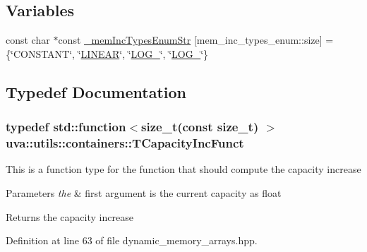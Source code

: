 \subsection*{Variables}
\begin{DoxyCompactItemize}
\item 
const char $\ast$const \hyperlink{namespaceuva_1_1utils_1_1containers_af8fa681c6894f17bfa25c736eb3d8ce8}{\+\_\+mem\+Inc\+Types\+Enum\+Str} \mbox{[}mem\+\_\+inc\+\_\+types\+\_\+enum\+::size\mbox{]} = \{\char`\"{}C\+O\+N\+S\+T\+A\+N\+T\char`\"{}, \char`\"{}\hyperlink{namespaceuva_1_1utils_1_1containers_a2dfd5027e0c656e7b8433760967da62daef7537589dc0f411a7215b5904b21073}{L\+I\+N\+E\+A\+R}\char`\"{}, \char`\"{}\hyperlink{namespaceuva_1_1utils_1_1containers_a2dfd5027e0c656e7b8433760967da62da8ca02671080014d040d3d1c7db41b447}{L\+O\+G\+\_}\char`\"{}, \char`\"{}\hyperlink{namespaceuva_1_1utils_1_1containers_a2dfd5027e0c656e7b8433760967da62daa0517306d9991f24d02b23c2df9ac368}{L\+O\+G\+\_}\char`\"{}\}
\end{DoxyCompactItemize}


\subsection{Typedef Documentation}
\hypertarget{namespaceuva_1_1utils_1_1containers_ab6acd1b6093503e17f6d8b942e9fccf1}{}
\subsubsection[{T\+Capacity\+Inc\+Funct}]{\setlength{\rightskip}{0pt plus 5cm}typedef std\+::function$<$size\+\_\+t(const size\+\_\+t) $>$ {\bf uva\+::utils\+::containers\+::\+T\+Capacity\+Inc\+Funct}}\label{namespaceuva_1_1utils_1_1containers_ab6acd1b6093503e17f6d8b942e9fccf1}
This is a function type for the function that should compute the capacity increase 
\begin{DoxyParams}{Parameters}
{\em the} & first argument is the current capacity as float \\
\hline
\end{DoxyParams}
\begin{DoxyReturn}{Returns}
the capacity increase 
\end{DoxyReturn}


Definition at line 63 of file dynamic\+\_\+memory\+\_\+arrays.\+hpp.




